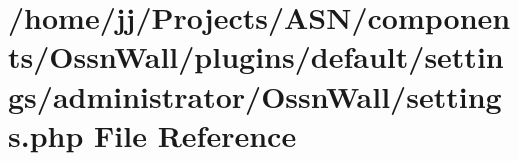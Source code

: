 \hypertarget{components_2_ossn_wall_2plugins_2default_2settings_2administrator_2_ossn_wall_2settings_8php}{}\section{/home/jj/\+Projects/\+A\+S\+N/components/\+Ossn\+Wall/plugins/default/settings/administrator/\+Ossn\+Wall/settings.php File Reference}
\label{components_2_ossn_wall_2plugins_2default_2settings_2administrator_2_ossn_wall_2settings_8php}
